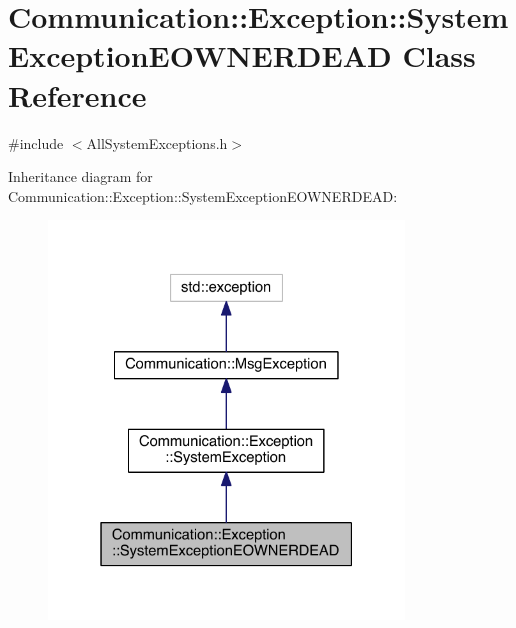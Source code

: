 \hypertarget{class_communication_1_1_exception_1_1_system_exception_e_o_w_n_e_r_d_e_a_d}{}\section{Communication\+:\+:Exception\+:\+:System\+Exception\+E\+O\+W\+N\+E\+R\+D\+E\+A\+D Class Reference}
\label{class_communication_1_1_exception_1_1_system_exception_e_o_w_n_e_r_d_e_a_d}


{\ttfamily \#include $<$All\+System\+Exceptions.\+h$>$}



Inheritance diagram for Communication\+:\+:Exception\+:\+:System\+Exception\+E\+O\+W\+N\+E\+R\+D\+E\+A\+D\+:\nopagebreak
\begin{figure}[H]
\begin{center}
\leavevmode
\includegraphics[width=268pt]{class_communication_1_1_exception_1_1_system_exception_e_o_w_n_e_r_d_e_a_d__inherit__graph}
\end{center}
\end{figure}


